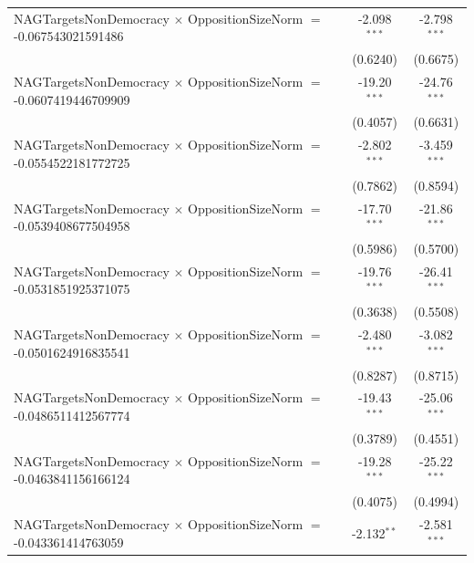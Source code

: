 \begin{tabular}{lcc}
   NAGTargetsNonDemocracy $\times$ OppositionSizeNorm $=$ -0.067543021591486    & -2.098$^{***}$       & -2.798$^{***}$\\   
                                                                                & (0.6240)             & (0.6675)\\   
   NAGTargetsNonDemocracy $\times$ OppositionSizeNorm $=$ -0.0607419446709909   & -19.20$^{***}$       & -24.76$^{***}$\\   
                                                                                & (0.4057)             & (0.6631)\\   
   NAGTargetsNonDemocracy $\times$ OppositionSizeNorm $=$ -0.0554522181772725   & -2.802$^{***}$       & -3.459$^{***}$\\   
                                                                                & (0.7862)             & (0.8594)\\   
   NAGTargetsNonDemocracy $\times$ OppositionSizeNorm $=$ -0.0539408677504958   & -17.70$^{***}$       & -21.86$^{***}$\\   
                                                                                & (0.5986)             & (0.5700)\\   
   NAGTargetsNonDemocracy $\times$ OppositionSizeNorm $=$ -0.0531851925371075   & -19.76$^{***}$       & -26.41$^{***}$\\   
                                                                                & (0.3638)             & (0.5508)\\   
   NAGTargetsNonDemocracy $\times$ OppositionSizeNorm $=$ -0.0501624916835541   & -2.480$^{***}$       & -3.082$^{***}$\\   
                                                                                & (0.8287)             & (0.8715)\\   
   NAGTargetsNonDemocracy $\times$ OppositionSizeNorm $=$ -0.0486511412567774   & -19.43$^{***}$       & -25.06$^{***}$\\   
                                                                                & (0.3789)             & (0.4551)\\   
   NAGTargetsNonDemocracy $\times$ OppositionSizeNorm $=$ -0.0463841156166124   & -19.28$^{***}$       & -25.22$^{***}$\\   
                                                                                & (0.4075)             & (0.4994)\\   
   NAGTargetsNonDemocracy $\times$ OppositionSizeNorm $=$ -0.043361414763059    & -2.132$^{**}$        & -2.581$^{***}$\\   

\end{tabular}
